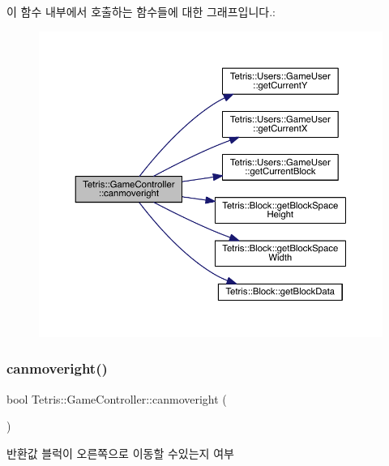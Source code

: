 이 함수 내부에서 호출하는 함수들에 대한 그래프입니다.\+:
\nopagebreak
\begin{figure}[H]
\begin{center}
\leavevmode
\includegraphics[width=350pt]{class_tetris_1_1_game_controller_a6c8189bb893502049396a7de1a73a88c_cgraph}
\end{center}
\end{figure}
\mbox{\label{class_tetris_1_1_game_controller_a6c8189bb893502049396a7de1a73a88c}} 
\subsubsection{\texorpdfstring{canmoveright()}{canmoveright()}\hspace{0.1cm}{\footnotesize\ttfamily [2/2]}}
{\footnotesize\ttfamily bool Tetris\+::\+Game\+Controller\+::canmoveright (\begin{DoxyParamCaption}{ }\end{DoxyParamCaption})\hspace{0.3cm}{\ttfamily [inline]}}

\begin{DoxyReturn}{반환값}
블럭이 오른쪽으로 이동할 수있는지 여부 
\end{DoxyReturn}


